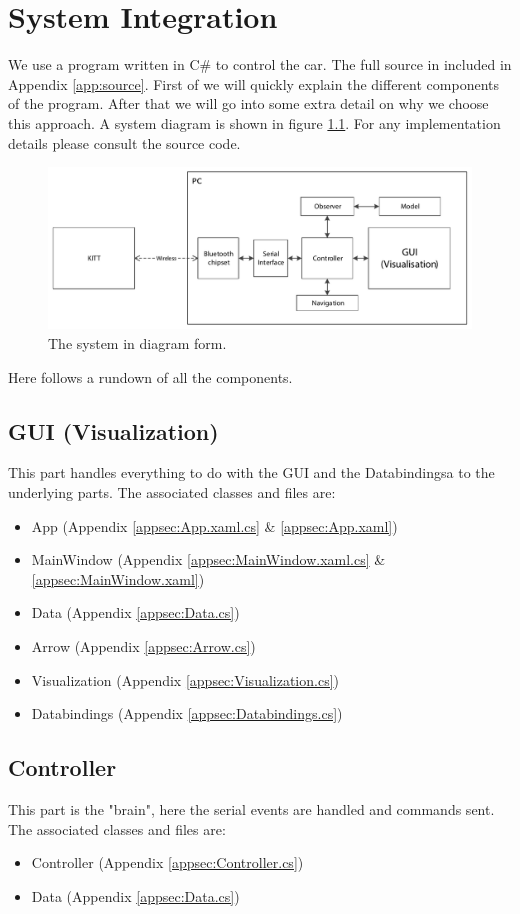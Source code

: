 \documentclass[final]{scrreprt} %
\begin{document}
\chapter{System Integration}
\label{ch:system-integration}
We use a program written in C\# to control the car.
The full source in included in Appendix \ref{app:source}.
First of we will quickly explain the different components of the program.
After that we will go into some extra detail on why we choose this approach.
A system diagram is shown in figure \ref{fig:system-diagram}.
For any implementation details please consult the source code.
\begin{figure}[H]
	\centering    	
    	\includegraphics[width=\textwidth]{resources/system-diagram.pdf}
    	\caption{The system in diagram form.}
    	\label{fig:system-diagram}
\end{figure}
Here follows a rundown of all the components.
\section{GUI (Visualization)}
This part handles everything to do with the GUI and the Databindingsa to the underlying parts.
The associated classes and files are:
\begin{itemize}
\item App (Appendix \ref{appsec:App.xaml.cs} \& \ref{appsec:App.xaml})
\item MainWindow (Appendix \ref{appsec:MainWindow.xaml.cs} \& \ref{appsec:MainWindow.xaml})
\item Data (Appendix \ref{appsec:Data.cs})
\item Arrow (Appendix \ref{appsec:Arrow.cs})
\item Visualization (Appendix \ref{appsec:Visualization.cs})
\item Databindings (Appendix \ref{appsec:Databindings.cs})
\end{itemize}
\section{Controller}
This part is the "brain", here the serial events are handled and commands sent.
The associated classes and files are:
\begin{itemize}
\item Controller (Appendix \ref{appsec:Controller.cs})
\item Data (Appendix \ref{appsec:Data.cs})
\end{itemize}
\end{document}
